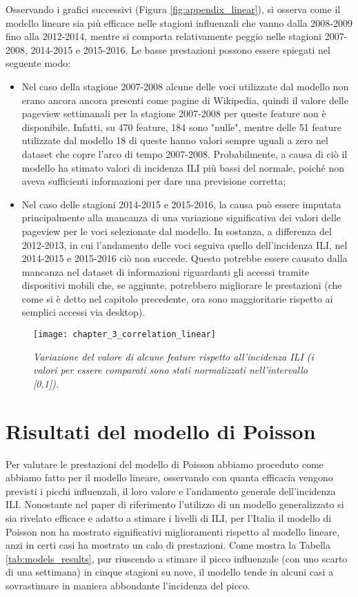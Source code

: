 Osservando i grafici successivi (Figura \ref{fig:appendix_linear}), si osserva come il modello lineare sia più efficace 
nelle stagioni influenzali che vanno dalla 2008-2009 fino alla 2012-2014, mentre si comporta relativamente peggio nelle 
stagioni 2007-2008, 2014-2015 e 2015-2016. Le basse prestazioni possono essere spiegati nel seguente modo: 
\begin{itemize}
\item Nel caso della stagione 2007-2008 alcune delle voci utilizzate dal modello non erano ancora ancora presenti come 
pagine di Wikipedia, quindi il valore delle pageview settimanali per la stagione 2007-2008 per queste feature non è 
disponibile. Infatti, su 470 feature, 184 sono "nulle", mentre delle 51 feature utilizzate dal modello 18 di queste hanno 
valori sempre uguali a zero nel dataset che copre l'arco di tempo 2007-2008. Probabilmente, a causa di ciò il modello ha 
stimato valori di incidenza ILI più bassi del normale, poiché non aveva sufficienti informazioni per dare una previsione 
corretta;
\item Nel caso delle stagioni 2014-2015 e 2015-2016, la causa può essere imputata principalmente alla mancanza di una 
variazione significativa dei valori delle pageview per le voci selezionate dal modello. In sostanza, a differenza del 
2012-2013, in cui l'andamento delle voci seguiva quello dell'incidenza ILI, nel 2014-2015 e 2015-2016 ciò non succede. 
Questo potrebbe essere causato dalla mancanza nel dataset di informazioni riguardanti gli accessi tramite dispositivi mobili 
che, se aggiunte, potrebbero migliorare le prestazioni (che come si è detto nel capitolo precedente, ora sono maggioritarie 
rispetto ai semplici accessi via desktop).
\end{itemize}

\begin{figure}[ht]
\texttt{[image: chapter\_3\_correlation\_linear]}
\caption{\textit{Variazione del valore di alcune feature rispetto all'incidenza ILI (i valori per essere comparati sono stati normalizzati nell'intervallo [0,1]).}}
\label{fig:ch_3_correlation_linear}
\centering
\end{figure}

\section{Risultati del modello di Poisson}
\bigskip

Per valutare le prestazioni del modello di Poisson abbiamo proceduto come abbiamo fatto per il modello lineare, osservando 
con quanta efficacia vengono previsti i picchi influenzali, il loro valore e l'andamento generale dell'incidenza ILI. 
Nonostante nel paper di riferimento \cite{McIver2014} l'utilizzo di un modello generalizzato si sia rivelato efficace e 
adatto a stimare i livelli di ILI, per l'Italia il modello di Poisson non ha mostrato significativi miglioramenti rispetto al 
modello lineare, anzi in certi casi ha mostrato un calo di prestazioni. Come mostra la Tabella 
\ref{tab:models_results}, pur riuscendo a stimare il picco influenzale (con uno scarto di una settimana) in cinque 
stagioni su nove, il modello tende in alcuni casi a sovrastimare in maniera abbondante l'incidenza del picco.
\bigskip

